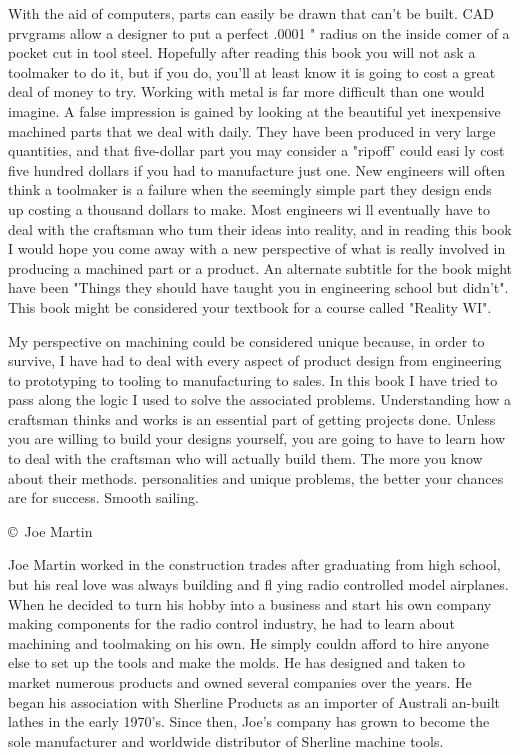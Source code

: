 
With the aid of computers, parts can easily be drawn
that can't be built. CAD prvgrams allow a designer
to put a perfect .0001 " radius on the inside comer of
a pocket cut in tool steel. Hopefully after reading
this book you will not ask a toolmaker to do it, but
if you do, you'll at least know it is going to cost a
great deal of money to try. Working with metal is
far more difficult than one would imagine. A false
impression is gained by looking at the beautiful yet
inexpensive machined parts that we deal with daily.
They have been produced in very large quantities,
and that five-dollar part you may consider a "ripoff'
could easi ly cost five hundred dollars if you
had to manufacture just one. New engineers will
often think a toolmaker is a failure when the
seemingly simple part they design ends up costing
a thousand dollars to make. Most engineers wi ll
eventually have to deal with the craftsman who tum
their ideas into reality, and in reading this book I
would hope you come away with a new perspective
of what is really involved in producing a machined
part or a product. An alternate subtitle for the book
might have been "Things they should have taught
you in engineering school but didn't". This book
might be considered your textbook for a course
called "Reality WI".


My perspective on machining could be considered
unique because, in order to survive, I have had to
deal with every aspect of product design from
engineering to prototyping to tooling to
manufacturing to sales. In this book I have tried to
pass along the logic I used to solve the associated
problems. Understanding how a craftsman thinks
and works is an essential part of getting projects
done. Unless you are willing to build your designs
yourself, you are going to have to learn how to deal
with the craftsman who will actually build them.
The more you know about their methods.
personalities and unique problems, the better your
chances are for success. Smooth sailing.

\bigskip\copyright\ Joe Martin


Joe Martin worked in the construction trades after graduating from high school,
but his real love was always building and fl ying radio controlled model
airplanes. When he decided to turn his hobby into a business and start his own
company making components for the radio control industry, he had to learn about
machining and toolmaking on his own. He simply couldn afford to hire anyone else
to set up the tools and make the molds. He has designed and taken to market
numerous products and owned several companies over the years. He began his
association with Sherline Products as an importer of Australi an-built lathes in
the early 1970's. Since then, Joe's company has grown to become the sole
manufacturer and worldwide distributor of Sherline machine tools.

